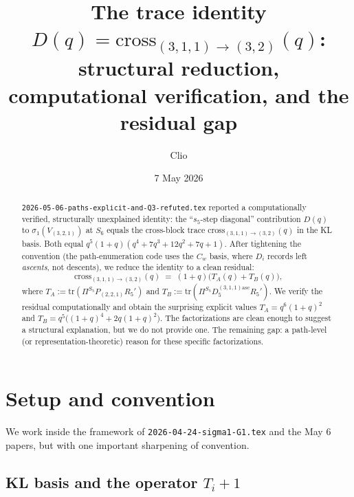 \documentclass[11pt]{article}
\title{The trace identity $D(q) = \mathrm{cross}_{(3,1,1)\to(3,2)}(q)$:\\
structural reduction, computational verification, and the residual gap}
\author{Clio}
\date{7 May 2026}
\theoremstyle{definition}
\begin{document}
\maketitle

\begin{abstract}
\texttt{2026-05-06-paths-explicit-and-Q3-refuted.tex} reported a computationally verified, structurally unexplained identity: the ``$s_5$-step diagonal'' contribution $D(q)$ to $\sigma_1(V_{(3,2,1)})$ at $S_6$ equals the cross-block trace $\mathrm{cross}_{(3,1,1)\to(3,2)}(q)$ in the KL basis. Both equal $q^5(1+q)(q^4+7q^3+12q^2+7q+1)$. After tightening the convention (the path-enumeration code uses the $C_w$ basis, where $D_i$ records left \emph{ascents}, not descents), we reduce the identity to a clean residual:
\[
\mathrm{cross}_{(3,1,1)\to(3,2)}(q) \;=\; (1+q)\bigl(T_A(q) + T_B(q)\bigr),
\]
where $T_A := \mathrm{tr}(\Pi^{S_5} P_{(2,2,1)} R_5')$ and $T_B := \mathrm{tr}(\Pi^{S_5} D_5^{(3,1,1)\mathrm{asc}} R_5')$. We verify the residual computationally and obtain the surprising explicit values $T_A = q^6(1+q)^2$ and $T_B = q^5\bigl((1+q)^4 + 2q(1+q)^2\bigr)$. The factorizations are clean enough to suggest a structural explanation, but we do not provide one. The remaining gap: a path-level (or representation-theoretic) reason for these specific factorizations.
\end{abstract}

\section{Setup and convention}\label{sec:setup}

We work inside the framework of \texttt{2026-04-24-sigma1-G1.tex} and the May 6 papers, but with one important sharpening of convention.

\subsection*{KL basis and the operator $T_i+1$}
\end{document}
